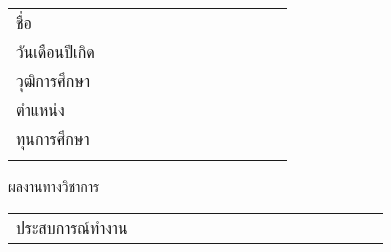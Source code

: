 \makeatletter
{}
\begin{longtable}{@{}p{0.34\linewidth}@{}p{0.66\linewidth}@{}}
	ชื่อ									& \@nametitle\@authorThai\\
	วันเดือนปีเกิด							& \@dateofbirth\\
	วุฒิการศึกษา			 & \parbox[t]{\linewidth}{\strut\@eduattainment\strut}\\
	\ifdefined\@workposition ตำแหน่ง	& \@workposition\\\fi
	\ifdefined\@scholarship ทุนการศึกษา		& \parbox[t]{\linewidth}{\strut\@scholarship\strut}\\\fi
\end{longtable}
\noindent ผลงานทางวิชาการ\vspace{\baselineskip}\newline
{}\vspace{0.5\baselineskip}
\ifdefined\@workposition
\begin{longtable}{@{}p{0.34\linewidth}@{}p{0.66\linewidth}@{}}
	ประสบการณ์ทำงาน					& \parbox[t]{\linewidth}{\strut\@workexperiences\strut}\\
\end{longtable}
\fi
\makeatother
